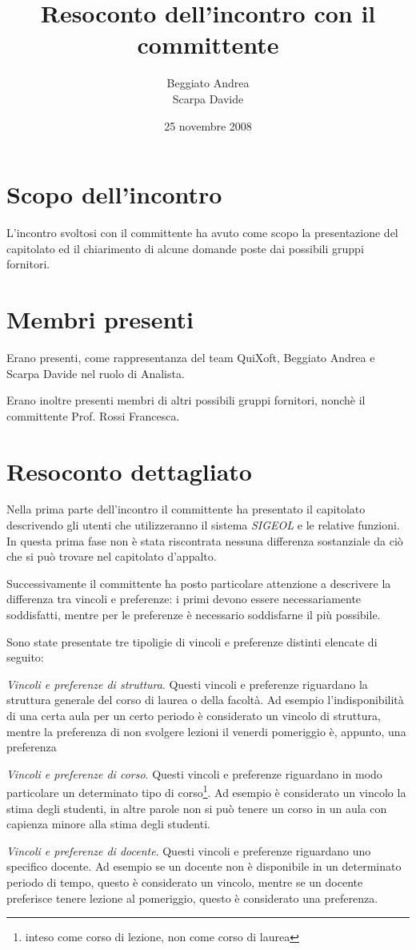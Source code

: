 \documentclass[11pt,a4paper]{article}
\title{Resoconto dell'incontro con il committente}
\author{Beggiato Andrea \\ Scarpa Davide}
\date{25 novembre 2008}
\begin{document}
\maketitle
\section{Scopo dell'incontro}
L'incontro svoltosi con il committente ha avuto come scopo la presentazione del capitolato ed il chiarimento di
alcune domande poste dai possibili gruppi fornitori.
\section{Membri presenti}
Erano presenti, come rappresentanza del team QuiXoft, Beggiato Andrea e Scarpa Davide nel ruolo di Analista.

Erano inoltre presenti membri di altri possibili gruppi fornitori, nonchè il committente Prof. Rossi Francesca.
\section{Resoconto dettagliato}
Nella prima parte dell'incontro il committente ha presentato il capitolato descrivendo gli utenti che utilizzeranno il sistema \textit{SIGEOL} e le relative funzioni. In questa prima fase non è stata riscontrata nessuna differenza sostanziale da ciò che si può trovare nel capitolato d'appalto.

Successivamente il committente ha posto particolare attenzione a descrivere la differenza tra vincoli e preferenze: i primi devono essere necessariamente soddisfatti, mentre per le preferenze è necessario soddisfarne il più possibile. 

Sono state presentate tre tipoligie di vincoli e preferenze distinti elencate di seguito:
	\begin{description}
	 \item \textit{Vincoli e preferenze di struttura}. Questi vincoli e preferenze riguardano la struttura generale del corso di laurea o della facoltà. Ad esempio l'indisponibilità di una certa aula per un certo periodo è considerato un vincolo di struttura, mentre la preferenza di non svolgere lezioni il venerdi pomeriggio è, appunto, una preferenza
	\item \textit{Vincoli e preferenze di corso}. Questi vincoli e preferenze riguardano in modo particolare un determinato tipo di corso\footnote{inteso come corso di lezione, non come corso di laurea}. Ad esempio è considerato un vincolo la stima degli studenti, in altre parole non si può tenere un corso in un aula con capienza minore alla stima degli studenti.
	\item \textit{Vincoli e preferenze di docente}. Questi vincoli e preferenze riguardano uno specifico docente. Ad esempio se un docente non è disponibile in un determinato periodo di tempo, questo è considerato un vincolo, mentre se un docente preferisce tenere lezione al pomeriggio, questo è considerato una preferenza.
 	\end{description}
\end{document}
